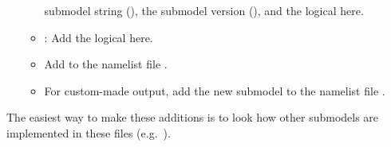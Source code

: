 \documentclass[a4paper,12pt,twoside]{article}
\begin{document}
\begin{enumerate}
\begin{itemize}
    submodel string (), the submodel version
    (), and the logical  here.
  \item {}: Add the logical
     here.
  \item Add  to the namelist file
    .
  \item For custom-made output, add the new submodel to the namelist
    file .
  \end{itemize}
\end{enumerate}

The easiest way to make these additions is to look how other submodels
are implemented in these files (e.g.\ ).
\end{document}
